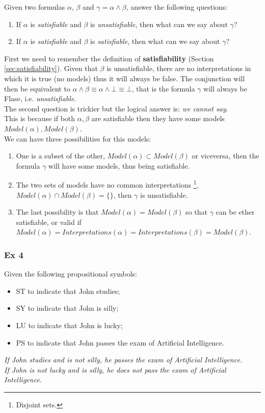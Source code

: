 \documentclass[10pt,a4paper]{article}
\begin{document}
Given two formulas $\alpha$, $\beta$ and $\gamma=\alpha \wedge \beta$, answer the following questions:
\begin{enumerate}
\item If $\alpha$ is \textit{satisfiable} and $\beta$ is \textit{unsatisfiable}, then what can we say about $\gamma$?
\item If $\alpha$ is \textit{satisfiable} and $\beta$ is \textit{satisfiable}, then what can we say about $\gamma$?\end{enumerate}

First we need to remember the definition of \textbf{satisfiability} (Section \ref{sec:satisfiability}). Given that $\beta$ is unsatisfiable, there are no interpretations in which it is true (no models) thus it will always be false. The conjunction will then be equivalent to $\alpha \wedge\beta \equiv \alpha \wedge \bot\equiv \bot$, that is the formula $\gamma$ will always be Flase, i.e. \textit{unsatisfiable}.\\

The second question is trickier but the logical answer is: \textit{we cannot say}.\\
This is because if both $\alpha,\beta$ are satisfiable then they have some models $Model(\alpha),Model(\beta)$.\\ 
We can have three possibilities for this models:
\begin{enumerate}
\item One is a subset of the other, $Model(\alpha)\subset Model(\beta)$ or viceversa, then the formula  $\gamma$ will have some models, thus being satisfiable.
\item The two sets of models have no common interpretations \footnote{Disjoint sets.}, $Model(\alpha)\cap Model(\beta)=\{\}$, then $\gamma$ is unsatisfiable.
\item The last possibility is that  $Model(\alpha)= Model(\beta)$ so that $\gamma$ can be ether satisfiable, or valid if $Model(\alpha)=Interpretations(\alpha)=Interpretations(\beta)=Model(\beta)$.
\end{enumerate}

\subsubsection{Ex 4}
Given the following propositional symbols:
\begin{itemize}
\item ST to indicate that John studies;
\item SY to indicate that John is silly;
\item LU to indicate that John is lucky;
\item PS to indicate that John passes the exam of Artificial Intelligence.
\end{itemize}
\begin{center}
\textit{If John studies and is not silly, he passes the exam of Artificial Intelligence.\\
If John is not lucky and is silly, he does not pass the exam of Artificial Intelligence.}
\end{center}
\end{document}
